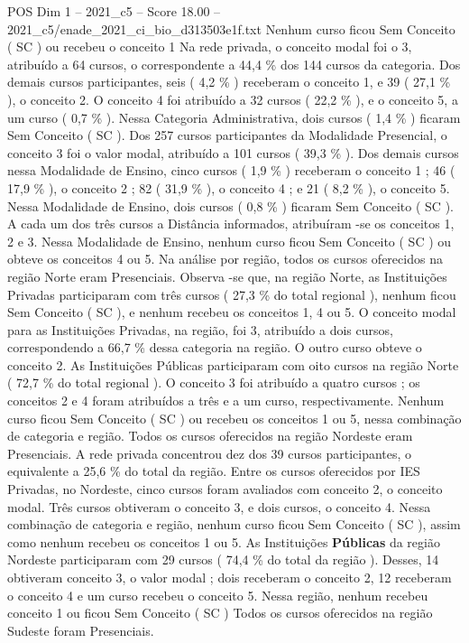 \begin{textsample}{POS Dim 1 – 2021\_c5 – Score 18.00 – 2021\_c5/enade\_2021\_ci\_bio\_d313503e1f.txt}
Nenhum curso ficou Sem Conceito ( SC ) ou recebeu o conceito 1 Na rede privada, o conceito modal foi o 3, atribuído a 64 cursos, o correspondente a 44,4 \% dos 144 cursos da categoria.
Dos demais cursos participantes, seis ( 4,2 \% ) receberam o conceito 1, e 39 ( 27,1 \% ), o conceito 2.
O conceito 4 foi atribuído a 32 cursos ( 22,2 \% ), e o conceito 5, a um curso ( 0,7 \% ).
Nessa Categoria Administrativa, dois cursos ( 1,4 \% ) ficaram Sem Conceito ( SC ).
Dos 257 cursos participantes da Modalidade Presencial, o conceito 3 foi o valor modal, atribuído a 101 cursos ( 39,3 \% ).
Dos demais cursos nessa Modalidade de Ensino, cinco cursos ( 1,9 \% ) receberam o conceito 1 ; 46 ( 17,9 \% ), o conceito 2 ; 82 ( 31,9 \% ), o conceito 4 ; e 21 ( 8,2 \% ), o conceito 5.
Nessa Modalidade de Ensino, dois cursos ( 0,8 \% ) ficaram Sem Conceito ( SC ).
A cada um dos três cursos a Distância informados, atribuíram -se os conceitos 1, 2 e 3.
Nessa Modalidade de Ensino, nenhum curso ficou Sem Conceito ( SC ) ou obteve os conceitos 4 ou 5.
Na análise por região, todos os cursos oferecidos na região Norte eram Presenciais.
Observa -se que, na região Norte, as Instituições Privadas participaram com três cursos ( 27,3 \% do total regional ), nenhum ficou Sem Conceito ( SC ), e nenhum recebeu os conceitos 1, 4 ou 5.
O conceito modal para as Instituições Privadas, na região, foi 3, atribuído a dois cursos, correspondendo a 66,7 \% dessa categoria na região.
O outro curso obteve o conceito 2.
As Instituições Públicas participaram com oito cursos na região Norte ( 72,7 \% do total regional ).
O conceito 3 foi atribuído a quatro cursos ; os conceitos 2 e 4 foram atribuídos a três e a um curso, respectivamente.
Nenhum curso ficou Sem Conceito ( SC ) ou recebeu os conceitos 1 ou 5, nessa combinação de categoria e região.
Todos os cursos oferecidos na região Nordeste eram Presenciais.
A rede privada concentrou dez dos 39 cursos participantes, o equivalente a 25,6 \% do total da região.
Entre os cursos oferecidos por IES Privadas, no Nordeste, cinco cursos foram avaliados com conceito 2, o conceito modal.
Três cursos obtiveram o conceito 3, e dois cursos, o conceito 4.
Nessa combinação de categoria e região, nenhum curso ficou Sem Conceito ( SC ), assim como nenhum recebeu os conceitos 1 ou 5.
As Instituições \textbf{Públicas} da região Nordeste participaram com 29 cursos ( 74,4 \% do total da região ).
Desses, 14 obtiveram conceito 3, o valor modal ; dois receberam o conceito 2, 12 receberam o conceito 4 e um curso recebeu o conceito 5.
Nessa região, nenhum recebeu conceito 1 ou ficou Sem Conceito ( SC ) Todos os cursos oferecidos na região Sudeste foram Presenciais.

\end{textsample}
